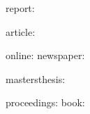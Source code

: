 \documentclass{ctexart}
\begin{document}
\tableofcontents

report: \cite{核反应堆压力容器的_LBB_分析}\par
article: \cite{图像的情感特征分析及其和谐感评价}\par
online: \cite{中国学术期刊标准化数据库系统工程的}
newspaper: \cite{文献题名}\par
mastersthesis: \cite{地质力学系统理论}\par
proceedings: \cite{绘画的音乐表现[A]}
book: \cite{图书馆史研究}

\printbibliography[heading=bibintoc]
\end{document}
